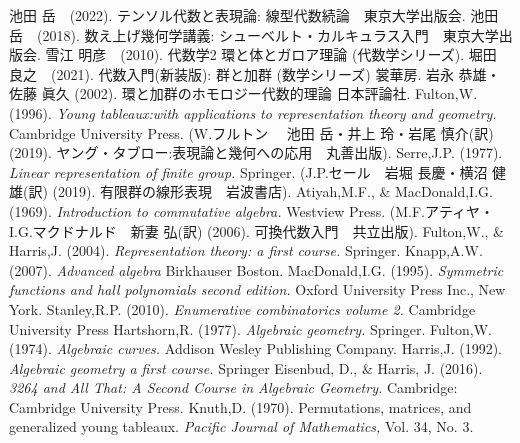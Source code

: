 \begin{thebibliography}{99}
  
   池田 岳　(2022). テンソル代数と表現論: 線型代数続論　東京大学出版会.
   池田 岳　(2018). 数え上げ幾何学講義: シューベルト・カルキュラス入門　東京大学出版会.
   雪江 明彦　(2010). 代数学2 環と体とガロア理論 (代数学シリーズ).
   堀田 良之　(2021). 代数入門(新装版): 群と加群 (数学シリーズ) 裳華房.
   岩永 恭雄・佐藤 眞久 (2002). 環と加群のホモロジー代数的理論 日本評論社.
   Fulton,W. (1996). \textit{Young tableaux:with applications to representation theory and geometry.} Cambridge University Press. (W.フルトン　 池田 岳・井上 玲・岩尾 慎介(訳) (2019). ヤング・タブロー:表現論と幾何への応用　丸善出版).
   Serre,J.P. (1977). \textit{Linear representation of finite group.} Springer. (J.P.セール　岩堀 長慶・横沼 健雄(訳) (2019). 有限群の線形表現　岩波書店).
   Atiyah,M.F., \& MacDonald,I.G. (1969). \textit{Introduction to commutative algebra.} Westview Press. (M.F.アティヤ・I.G.マクドナルド　新妻 弘(訳) (2006). 可換代数入門　共立出版).
   Fulton,W., \& Harris,J. (2004). \textit{Representation theory: a first course.} Springer. 
  Knapp,A.W. (2007). \textit{Advanced algebra} Birkhauser Boston.
   MacDonald,I.G. (1995). \textit{Symmetric functions and hall polynomials second edition.}  Oxford University Press Inc., New York.
   Stanley,R.P. (2010). \textit{Enumerative combinatorics volume 2.} Cambridge University Press
   Hartshorn,R. (1977). \textit{Algebraic geometry.} Springer.
   Fulton,W. (1974). \textit{Algebraic curves.} Addison Wesley Publishing Company. 
   Harris,J. (1992). \textit{Algebraic geometry a first course.} Springer
  Eisenbud, D., \& Harris, J. (2016). \textit{3264 and All That: A Second Course in Algebraic Geometry. }Cambridge: Cambridge University Press. 
   Knuth,D. (1970). Permutations, matrices, and generalized young tableaux. \textit{Pacific Journal of Mathematics, }Vol. 34, No. 3.
\end{thebibliography} 